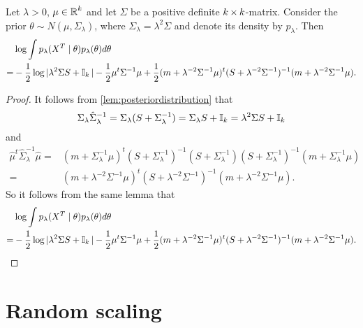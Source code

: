 \documentclass[12pt]{article}
\begin{document}
\begin{lemma}\label{lem:marginallikelihood}
Let $\lambda>0$, $\mu\in\operatorname{\mathbb{R}}^k$ and let $\Sigma$ be a positive definite $k\operatorname{\times} k$-matrix. Consider the prior \(\theta\sim N(\mu,\Sigma_\lambda)\), where \(\Sigma_\lambda=\lambda^2\Sigma \) and denote its density by $p_\lambda$. Then 
\begin{equation}\label{eq:marginallikelihood}
\begin{split}
  &\log \int  p_\lambda(X^T\mid\theta)p_\lambda(\theta)d\theta  \\= &-\frac12\log |\lambda^2\Sigma  S + \operatorname{\mathbb{I}}_k|  -\frac12\mu^t\Sigma^{-1}\mu+ \frac12(m + \lambda^{-2}\Sigma^{-1}\mu)^t ( S + \lambda^{-2}\Sigma^{-1} )^{-1} (m + \lambda^{-2}\Sigma^{-1}\mu).
\end{split}
\end{equation}

\end{lemma}
\begin{proof}It follows from \cref{lem:posteriordistribution} that 
  \[
\Sigma_\lambda \hat \Sigma_\lambda ^{-1} = \Sigma_\lambda (S+\Sigma_\lambda ^{-1})= \Sigma_\lambda  S + \operatorname{\mathbb{I}}_k=\lambda^2\Sigma  S + \operatorname{\mathbb{I}}_k
\]
and\begin{align*}
\hat \mu^t \hat\Sigma_\lambda^{-1} \hat\mu =&  (m + \Sigma_\lambda^{-1}\mu)^t( S + \Sigma_\lambda^{-1} )^{-1}( S + \Sigma_\lambda^{-1} )( S + \Sigma_\lambda^{-1} )^{-1} (m + \Sigma_\lambda^{-1}\mu)\\
=&  (m + \lambda^{-2}\Sigma^{-1}\mu)^t ( S + \lambda^{-2}\Sigma^{-1} )^{-1} (m + \lambda^{-2}\Sigma^{-1}\mu). 
\end{align*}
So it follows from the same lemma that 
\begin{align*}
    &\log \int  p_\lambda(X^T\mid\theta)p_\lambda(\theta)d\theta  \\= &-\frac12\log |\lambda^2\Sigma  S + \operatorname{\mathbb{I}}_k|  -\frac12\mu^t\Sigma^{-1}\mu+ \frac12(m + \lambda^{-2}\Sigma^{-1}\mu)^t ( S + \lambda^{-2}\Sigma^{-1} )^{-1} (m + \lambda^{-2}\Sigma^{-1}\mu).
\end{align*}
\end{proof}

\section{Random scaling}
\end{document}
